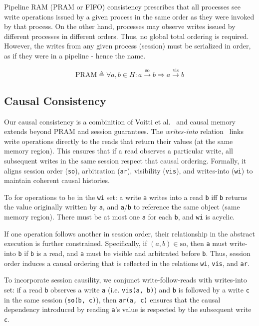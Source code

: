 Pipeline RAM (PRAM or FIFO) consistency prescribes that all processes see write
operations issued by a given process in the same order as they were invoked by
that process. On the other hand, processes may observe writes issued by
different processes in different orders. Thus, no global total ordering is
required. However, the writes from any given process (session) must be
serialized in order, as if they were in a pipeline - hence the name.

$$
  \text{PRAM} \triangleq \forall a, b \in H: a \xrightarrow{\text{so}} b \Rightarrow a \xrightarrow{\text{vis}} b
$$

\subsection{Causal Consistency}

Our causal consistency is a combinition of Voitti et al.~\cite{viotti2016consistency}
and causal memory~\cite{baldoni2002an} extends beyond PRAM and session guarantees. The
\textit{writes-into} relation~\cite{baldoni2002an} links write operations directly to the
reads that return their values (at the same memory region). This ensures that if
a read observes a particular write, all subsequent writes in the same session
respect that causal ordering. Formally, it aligns session order (\texttt{so}),
arbitration (\texttt{ar}), visibility (\texttt{vis}), and writes-into (\texttt{wi}) to maintain
coherent causal histories.

To for operations to be in the \texttt{wi} set: a write \texttt{a} writes into a read \texttt{b} iff \texttt{b} returns
the value originally written by \texttt{a}, and \texttt{a}/\texttt{b} to reference the same object
(same memory region). There must be at most one \texttt{a} for each \texttt{b}, and \texttt{wi} is
acyclic.

If one operation follows another in session order, their relationship in the
abstract execution is further constrained. Specifically, if $(a, b) \in \text{so}$,
then \texttt{a} must write-into \texttt{b} if \texttt{b} is a read, and \texttt{a} must be visible and
arbitrated before \texttt{b}. Thus, session order induces a causal ordering that is
reflected in the relations \texttt{wi}, \texttt{vis}, and \texttt{ar}.

To incorporate session causility, we conjunct write-follow-reads with
writes-into set: if a read \texttt{b} observes a write \texttt{a} (i.e. \texttt{vis(a, b)}) and \texttt{b} is
followed by a write \texttt{c} in the same session (\texttt{so(b, c)}), then \texttt{ar(a, c)} ensures
that the causal dependency introduced by reading \texttt{a}'s value is respected by the
subsequent write \texttt{c}.

